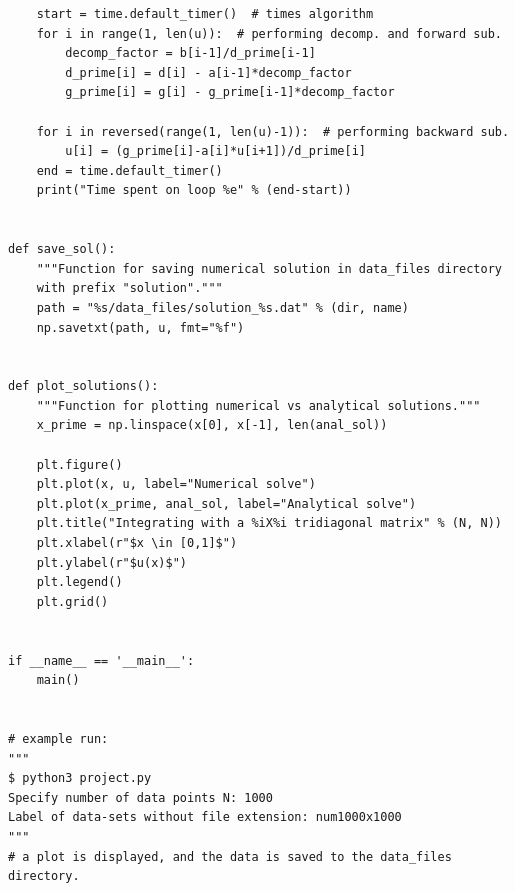 \documentclass[english,notitlepage]{revtex4-1}  %
\begin{document}
\begin{lstlisting}
    start = time.default_timer()  # times algorithm
    for i in range(1, len(u)):  # performing decomp. and forward sub.
        decomp_factor = b[i-1]/d_prime[i-1]
        d_prime[i] = d[i] - a[i-1]*decomp_factor
        g_prime[i] = g[i] - g_prime[i-1]*decomp_factor

    for i in reversed(range(1, len(u)-1)):  # performing backward sub.
        u[i] = (g_prime[i]-a[i]*u[i+1])/d_prime[i]
    end = time.default_timer()
    print("Time spent on loop %e" % (end-start))


def save_sol():
    """Function for saving numerical solution in data_files directory
    with prefix "solution"."""
    path = "%s/data_files/solution_%s.dat" % (dir, name)
    np.savetxt(path, u, fmt="%f")


def plot_solutions():
    """Function for plotting numerical vs analytical solutions."""
    x_prime = np.linspace(x[0], x[-1], len(anal_sol))

    plt.figure()
    plt.plot(x, u, label="Numerical solve")
    plt.plot(x_prime, anal_sol, label="Analytical solve")
    plt.title("Integrating with a %iX%i tridiagonal matrix" % (N, N))
    plt.xlabel(r"$x \in [0,1]$")
    plt.ylabel(r"$u(x)$")
    plt.legend()
    plt.grid()


if __name__ == '__main__':
    main()


# example run:
"""
$ python3 project.py
Specify number of data points N: 1000
Label of data-sets without file extension: num1000x1000
"""
# a plot is displayed, and the data is saved to the data_files directory.

\end{lstlisting}
\end{document}
